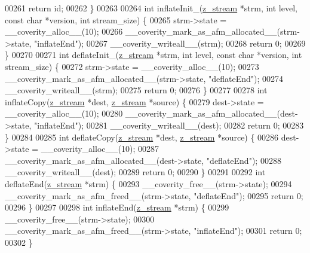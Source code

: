 \begin{DoxyCode}
00261     \textcolor{keywordflow}{return} id;
00262 \}
00263 
00264 \textcolor{keywordtype}{int} inflateInit\_(\hyperlink{structz__stream__s}{z\_stream} *strm, \textcolor{keywordtype}{int} level, \textcolor{keyword}{const} \textcolor{keywordtype}{char} *version, \textcolor{keywordtype}{int} stream\_size) \{
00265     strm->state = \_\_coverity\_alloc\_\_(10);
00266     \_\_coverity\_mark\_as\_afm\_allocated\_\_(strm->state, \textcolor{stringliteral}{"inflateEnd"});
00267     \_\_coverity\_writeall\_\_(strm);
00268     \textcolor{keywordflow}{return} 0;
00269 \}
00270 
00271 \textcolor{keywordtype}{int} deflateInit\_(\hyperlink{structz__stream__s}{z\_stream} *strm, \textcolor{keywordtype}{int} level, \textcolor{keyword}{const} \textcolor{keywordtype}{char} *version, \textcolor{keywordtype}{int} stream\_size) \{
00272     strm->state = \_\_coverity\_alloc\_\_(10);
00273     \_\_coverity\_mark\_as\_afm\_allocated\_\_(strm->state, \textcolor{stringliteral}{"deflateEnd"});
00274     \_\_coverity\_writeall\_\_(strm);
00275     \textcolor{keywordflow}{return} 0;
00276 \}
00277 
00278 \textcolor{keywordtype}{int} inflateCopy(\hyperlink{structz__stream__s}{z\_stream} *dest, \hyperlink{structz__stream__s}{z\_stream} *source) \{
00279     dest->state = \_\_coverity\_alloc\_\_(10);
00280     \_\_coverity\_mark\_as\_afm\_allocated\_\_(dest->state, \textcolor{stringliteral}{"inflateEnd"});
00281     \_\_coverity\_writeall\_\_(dest);
00282     \textcolor{keywordflow}{return} 0;
00283 \}
00284 
00285 \textcolor{keywordtype}{int} deflateCopy(\hyperlink{structz__stream__s}{z\_stream} *dest, \hyperlink{structz__stream__s}{z\_stream} *source) \{
00286     dest->state = \_\_coverity\_alloc\_\_(10);
00287     \_\_coverity\_mark\_as\_afm\_allocated\_\_(dest->state, \textcolor{stringliteral}{"deflateEnd"});
00288     \_\_coverity\_writeall\_\_(dest);
00289     \textcolor{keywordflow}{return} 0;
00290 \}
00291 
00292 \textcolor{keywordtype}{int} deflateEnd(\hyperlink{structz__stream__s}{z\_stream} *strm) \{
00293     \_\_coverity\_free\_\_(strm->state);
00294     \_\_coverity\_mark\_as\_afm\_freed\_\_(strm->state, \textcolor{stringliteral}{"deflateEnd"});
00295     \textcolor{keywordflow}{return} 0;
00296 \}
00297 
00298 \textcolor{keywordtype}{int} inflateEnd(\hyperlink{structz__stream__s}{z\_stream} *strm) \{
00299     \_\_coverity\_free\_\_(strm->state);
00300     \_\_coverity\_mark\_as\_afm\_freed\_\_(strm->state, \textcolor{stringliteral}{"inflateEnd"});
00301     \textcolor{keywordflow}{return} 0;
00302 \}
\end{DoxyCode}
